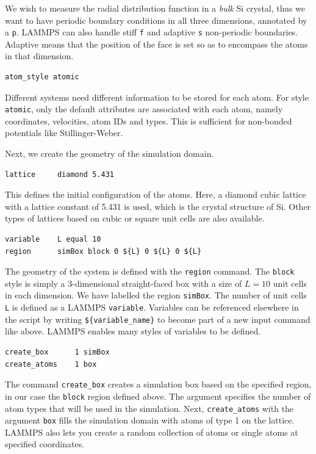 \documentclass[twoside,english]{uiofysmaster}
\begin{document}
We wish to measure the radial distribution function in a \textit{bulk}
Si crystal, thus we want to have periodic 
boundary conditions in all three dimensions, 
annotated by a \texttt{p}. LAMMPS can also handle stiff \texttt{f}
and adaptive \texttt{s} non-periodic boundaries. Adaptive
means that the position of the face is set so as to
encompass the atoms in that dimension. 
\begin{lstlisting}[style=lammps]
 atom_style atomic
\end{lstlisting}
Different systems need different information
to be stored for each atom. For style \texttt{atomic}, only
the default attributes are associated with each atom, 
namely coordinates, velocities, atom IDs and types. 
This is sufficient for non-bonded potentials like Stillinger-Weber.

\noindent Next, we create the geometry of the simulation domain.
\begin{lstlisting}[style=lammps]
lattice 	diamond 5.431
\end{lstlisting}
This defines the initial configuration of the atoms. 
Here, a diamond cubic lattice with a lattice constant of
5.431 is used, which is the crystal structure of Si. Other types of lattices based on
cubic or square unit cells are also available. 
\begin{lstlisting}[style=lammps]
variable	L equal 10
region 		simBox block 0 ${L} 0 ${L} 0 ${L}
\end{lstlisting}
The geometry of the system is defined with the \texttt{region}
command. The \texttt{block} style is simply a 3-dimensional
straight-faced box with a size of $L = 10$ unit
cells in each dimension. We have labelled the 
region \texttt{simBox}. 
The number of unit cells
\texttt{L} is defined as a LAMMPS \texttt{variable}. Variables
can be referenced elsewhere in the script by
writing \texttt{\$\{variable\_name\}} to become part of a new input
command like above. LAMMPS enables many styles
of variables to be defined. 
\begin{lstlisting}[style=lammps]
create_box		1 simBox
create_atoms	1 box
\end{lstlisting}
The command \texttt{create\_box} creates a simulation box 
based on the specified region, in our case the 
\texttt{block} region defined above. The argument specifies
the number of atom types that will be used in the
simulation. Next, \texttt{create\_atoms} with the argument
\texttt{box} fills the simulation
domain with atoms of type 1 on the lattice. 
LAMMPS also lets you create a random collection
of atoms or single atoms at specified coordinates.
\end{document}
